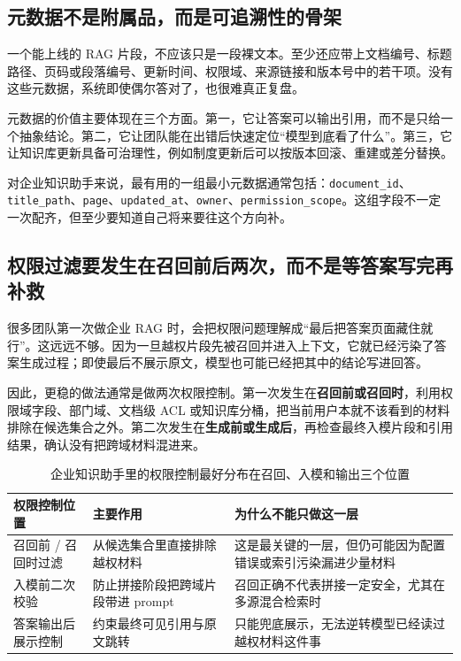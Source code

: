 \subsection{元数据不是附属品，而是可追溯性的骨架}
一个能上线的 RAG 片段，不应该只是一段裸文本。至少还应带上文档编号、标题路径、页码或段落编号、更新时间、权限域、来源链接和版本号中的若干项。没有这些元数据，系统即使偶尔答对了，也很难真正复盘。

元数据的价值主要体现在三个方面。第一，它让答案可以输出引用，而不是只给一个抽象结论。第二，它让团队能在出错后快速定位“模型到底看了什么”。第三，它让知识库更新具备可治理性，例如制度更新后可以按版本回滚、重建或差分替换。

对企业知识助手来说，最有用的一组最小元数据通常包括：\texttt{document\_id}、\texttt{title\_path}、\texttt{page}、\texttt{updated\_at}、\texttt{owner}、\texttt{permission\_scope}。这组字段不一定一次配齐，但至少要知道自己将来要往这个方向补。

\subsection{权限过滤要发生在召回前后两次，而不是等答案写完再补救}
很多团队第一次做企业 RAG 时，会把权限问题理解成“最后把答案页面藏住就行”。这远远不够。因为一旦越权片段先被召回并进入上下文，它就已经污染了答案生成过程；即使最后不展示原文，模型也可能已经把其中的结论写进回答。

因此，更稳的做法通常是做两次权限控制。第一次发生在\textbf{召回前或召回时}，利用权限域字段、部门域、文档级 ACL 或知识库分桶，把当前用户本就不该看到的材料排除在候选集合之外。第二次发生在\textbf{生成前或生成后}，再检查最终入模片段和引用结果，确认没有把跨域材料混进来。

\begin{table}[H]
\centering
\small
\begin{tabularx}{\textwidth}{>{\raggedright\arraybackslash}p{2.8cm}>{\raggedright\arraybackslash}p{3.2cm}>{\raggedright\arraybackslash}X}
\toprule
\textbf{权限控制位置} & \textbf{主要作用} & \textbf{为什么不能只做这一层} \\
\midrule
召回前 / 召回时过滤 & 从候选集合里直接排除越权材料 & 这是最关键的一层，但仍可能因为配置错误或索引污染漏进少量材料 \\
入模前二次校验 & 防止拼接阶段把跨域片段带进 prompt & 召回正确不代表拼接一定安全，尤其在多源混合检索时 \\
答案输出后展示控制 & 约束最终可见引用与原文跳转 & 只能兜底展示，无法逆转模型已经读过越权材料这件事 \\
\bottomrule
\end{tabularx}
\caption{企业知识助手里的权限控制最好分布在召回、入模和输出三个位置}
\label{tab:rag-permission-guard}
\end{table}

